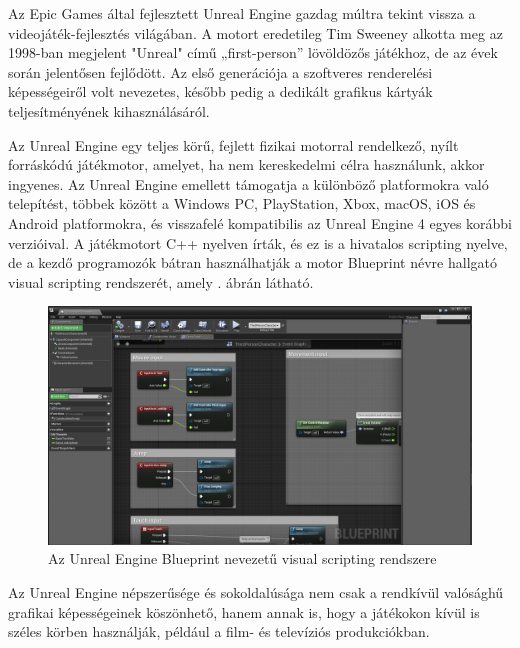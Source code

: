 
Az Epic Games által fejlesztett Unreal Engine gazdag múltra tekint vissza a videojáték-fejlesztés világában. A motort eredetileg Tim Sweeney alkotta meg az 1998-ban megjelent "Unreal" című „first-person” lövöldözős játékhoz, de az évek során jelentősen fejlődött. Az első generációja a szoftveres renderelési képességeiről volt nevezetes, később pedig a dedikált grafikus kártyák teljesítményének kihasználásáról.\cite{unrealengine1}

Az Unreal Engine egy teljes körű, fejlett fizikai motorral rendelkező, nyílt forráskódú játékmotor, amelyet, ha nem kereskedelmi célra használunk, akkor ingyenes. Az Unreal Engine emellett támogatja a különböző platformokra való telepítést, többek között a Windows PC, PlayStation, Xbox, macOS, iOS és Android platformokra, és visszafelé kompatibilis az Unreal Engine 4 egyes korábbi verzióival. A játékmotort C++ nyelven írták, és ez is a hivatalos scripting nyelve, de a kezdő programozók bátran használhatják a motor Blueprint névre hallgató visual scripting rendszerét, amely . ábrán látható.\cite{unrealengine1}

\begin{figure}[ht]
\centering
\includegraphics[scale = 0.2]{images/blueprinteditor_windows.png}
\caption{Az Unreal Engine Blueprint nevezetű visual scripting rendszere\cite{unrealengine2}}
\label{fig:unrealblueprint}
\end{figure}

Az Unreal Engine népszerűsége és sokoldalúsága nem csak a rendkívül valósághű grafikai képességeinek köszönhető, hanem annak is, hogy a játékokon kívül is széles körben használják, például a film- és televíziós produkciókban.


